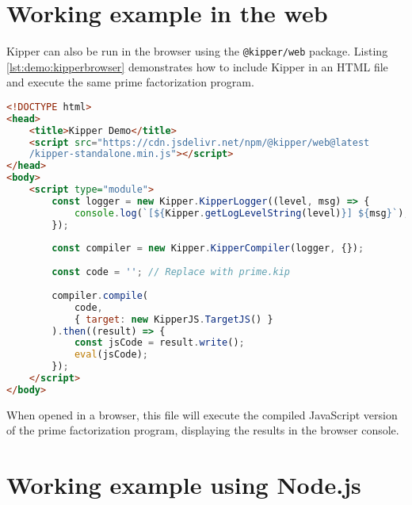 \section{Working example in the web}

Kipper can also be run in the browser using the \texttt{@kipper/web} package. Listing \ref{lst:demo:kipperbrowser} demonstrates how to include Kipper in an HTML file and execute the same prime factorization program.

\begin{lstlisting}[language=HTML,caption=Running Kipper in the browser, label=lst:demo:kipperbrowser]
<!DOCTYPE html>
<head>
	<title>Kipper Demo</title>
	<script src="https://cdn.jsdelivr.net/npm/@kipper/web@latest
	/kipper-standalone.min.js"></script>
</head>
<body>
	<script type="module">
		const logger = new Kipper.KipperLogger((level, msg) => {
			console.log(`[${Kipper.getLogLevelString(level)}] ${msg}`);
		});
		
		const compiler = new Kipper.KipperCompiler(logger, {});
		
		const code = ''; // Replace with prime.kip
		
		compiler.compile(
			code, 
			{ target: new KipperJS.TargetJS() }
		).then((result) => {
			const jsCode = result.write();
			eval(jsCode);
		});
	</script>
</body>
\end{lstlisting}

When opened in a browser, this file will execute the compiled JavaScript version of the prime factorization program, displaying the results in the browser console.

\section{Working example using Node.js}


